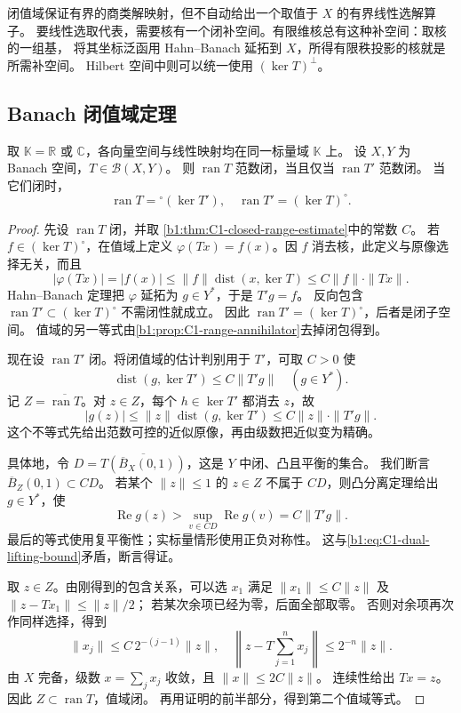 \ProseParagraphBreak

闭值域保证有界的商类解映射，但不自动给出一个取值于 \(X\) 的有界线性选解算子。
要线性选取代表，需要核有一个闭补空间。有限维核总有这种补空间：取核的一组基，
将其坐标泛函用 Hahn--Banach 延拓到 \(X\)，所得有限秩投影的核就是所需补空间。
Hilbert 空间中则可以统一使用 \((\ker T)^\perp\)。

\subsection{Banach 闭值域定理}
\label{b1:subsec:C10302}

\begin{theorem}\label{b1:thm:C1-banach-closed-range}
取 \(\mathbb K=\mathbb R\) 或 \(\mathbb C\)，各向量空间与线性映射均在同一标量域 \(\mathbb K\) 上。
设 \(X,Y\) 为 Banach 空间，\(T\in\mathcal B(X,Y)\)。
则 \(\operatorname{ran}T\) 范数闭，当且仅当 \(\operatorname{ran}T'\) 范数闭。
当它们闭时，
\[
 \operatorname{ran}T={}^{\circ}(\ker T'),\quad
 \operatorname{ran}T'=(\ker T)^\circ.
\]
\end{theorem}
\begin{proof}
先设 \(\operatorname{ran}T\) 闭，并取%
\cref{b1:thm:C1-closed-range-estimate}中的常数 \(C\)。
若 \(f\in(\ker T)^\circ\)，在值域上定义
\(\varphi(Tx)=f(x)\)。因 \(f\) 消去核，此定义与原像选择无关，而且
\[
 |\varphi(Tx)|=|f(x)|
 \leq\|f\|\operatorname{dist}(x,\ker T)
 \leq C\|f\|\cdot\|Tx\|.
\]
Hahn--Banach 定理把 \(\varphi\) 延拓为 \(g\in Y^*\)，于是 \(T'g=f\)。
反向包含 \(\operatorname{ran}T'\subset(\ker T)^\circ\) 不需闭性就成立。
因此 \(\operatorname{ran}T'=(\ker T)^\circ\)，后者是闭子空间。
值域的另一等式由\cref{b1:prop:C1-range-annihilator}去掉闭包得到。

现在设 \(\operatorname{ran}T'\) 闭。将闭值域的估计判别用于 \(T'\)，可取 \(C>0\) 使
\[
 \operatorname{dist}(g,\ker T')\leq C\|T'g\|\quad(g\in Y^*).
\]
记 \(Z=\overline{\operatorname{ran}T}\)。对 \(z\in Z\)，每个 \(h\in\ker T'\) 都消去 \(z\)，故
\begin{equation}\label{b1:eq:C1-dual-lifting-bound}
 |g(z)|\leq\|z\|\operatorname{dist}(g,\ker T')
 \leq C\|z\|\cdot\|T'g\|.
\end{equation}
这个不等式先给出范数可控的近似原像，再由级数把近似变为精确。

具体地，令 \(D=\overline{T(\overline B_X(0,1))}\)，这是 \(Y\) 中闭、凸且平衡的集合。
我们断言 \(\overline B_Z(0,1)\subset CD\)。
若某个 \(\|z\|\leq1\) 的 \(z\in Z\) 不属于 \(CD\)，则凸分离定理给出
\(g\in Y^*\)，使
\[
 \operatorname{Re}g(z)>\sup_{v\in CD}\operatorname{Re}g(v)=C\|T'g\|.
\]
最后的等式使用复平衡性；实标量情形使用正负对称性。
这与\eqref{b1:eq:C1-dual-lifting-bound}矛盾，断言得证。

取 \(z\in Z\)。由刚得到的包含关系，可以选 \(x_1\) 满足
\(\|x_1\|\leq C\|z\|\) 及 \(\|z-Tx_1\|\leq\|z\|/2\)；
若某次余项已经为零，后面全部取零。
否则对余项再次作同样选择，得到
\[
 \|x_j\|\leq C\,2^{-(j-1)}\|z\|,\quad
 \left\|z-T\sum_{j=1}^n x_j\right\|\leq2^{-n}\|z\|.
\]
由 \(X\) 完备，级数 \(x=\sum_jx_j\) 收敛，且 \(\|x\|\leq2C\|z\|\)。
连续性给出 \(Tx=z\)。因此 \(Z\subset\operatorname{ran}T\)，值域闭。
再用证明的前半部分，得到第二个值域等式。
\end{proof}

